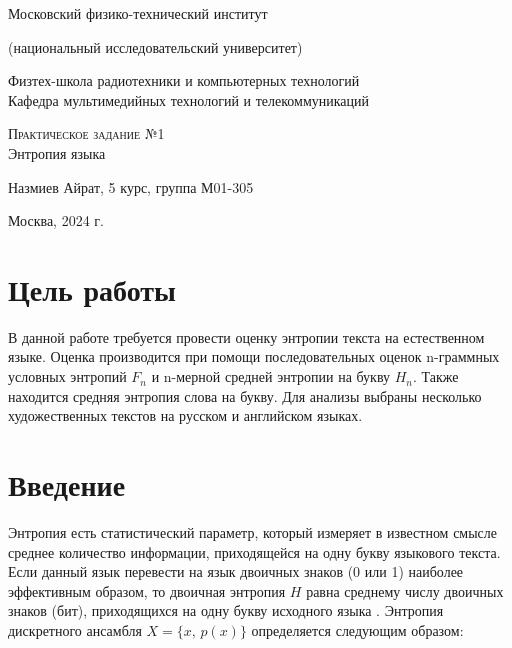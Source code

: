 \documentclass[a4paper,12pt]{article}
\begin{document}
	
	\begin{titlepage}
		\begin{center}
			
			\vspace{0.5cm}
			\large
			Московский физико-технический институт 
			
			(национальный исследовательский университет)
			\vspace{0.25cm}
			
			Физтех-школа радиотехники и компьютерных технологий \\
			
			Кафедра мультимедийных технологий и телекоммуникаций
			\vfill
			
			\textsc{Практическое задание №1}\\[5mm]
			
			{\LARGE Энтропия языка}
			\bigskip
			
			Назмиев Айрат, 5 курс, группа М01-305
		\end{center}
		\vfill
		
		\newlength{\ML}
		
		\vfill
		\vfill
		
		\begin{center}
			Москва, 2024 г.
		\end{center}
		
	\end{titlepage}
	
	\section*{Цель работы}
	В данной работе требуется провести оценку энтропии текста на естественном языке. Оценка производится при помощи последовательных оценок n-граммных условных энтропий $F_n$ и n-мерной средней энтропии на букву $H_n$. Также находится средняя энтропия слова на букву. Для анализы выбраны несколько художественных текстов на русском и английском языках.
	
	\section*{Введение}
	Энтропия есть статистический параметр, который измеряет в известном
	смысле среднее количество информации, приходящейся на одну букву языкового текста. Если данный язык перевести на язык двоичных знаков (0 или 1) наиболее эффективным образом, то двоичная энтропия $H$ равна среднему числу
	двоичных знаков (бит), приходящихся на одну букву исходного языка \cite{fominykh2024}. Энтропия дискретного ансамбля $X = \{x,\,p(x)\}$ определяется следующим образом:
	
\end{document}
